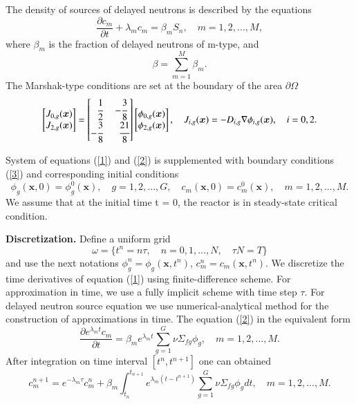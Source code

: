 \documentclass[authoryear]{elsarticle}
\begin{document}
The density of sources of delayed neutrons is described by the equations
\begin{equation}\label{2}
	\frac{\partial c_m}{\partial t} + \lambda_m c_m = \beta_m S_{n}, \quad m = 1,2, ..., M,
\end{equation}
where $\beta_m$ is the fraction of delayed neutrons of m-type, and
\[
	\beta = \sum_{m=1}^{M} \beta_m.
\] 
The Marshak-type conditions are set at the boundary of the area $\partial \Omega$
\begin{equation}\label{3}
\begin{split}
	\begin{bmatrix}
		J_{0,g}(\bm x) \\
		J_{2,g}(\bm x) \\
	\end{bmatrix}
	=
	\begin{bmatrix}
		\phantom{-} \cfrac{1}{2} & - \cfrac{3}{8} \\
	    -\cfrac{3}{8} & \phantom{-} \cfrac{21}{8} \\
	\end{bmatrix}
	\begin{bmatrix}
		\phi_{0,g}(\bm x) \\
		\phi_{2,g}(\bm x) \\
	\end{bmatrix}, \quad
	J_{i,g}(\bm x) = - D_{i,g} \nabla \phi_{i,g}(\bm x), \quad i = 0, 2.
\end{split}
\end{equation}

System of equations (\ref{1}) and (\ref{2}) is supplemented with boundary conditions (\ref{3}) and corresponding initial conditions
\begin{equation}\label{4}
	\phi_g(\bm x,0) = \phi_g^0(\bm x), \quad g = 1,2, ..., G, 
	\quad c_m(\bm x,0) = c_m^0(\bm x), \quad m = 1,2, ..., M.
\end{equation}
We assume that at the initial time t = 0, the reactor is in steady-state critical condition.

\textbf{Discretization.}
Define a uniform grid
\[
	\omega = \{ t^n=n \tau, \quad n = 0,1,...,N, \quad \tau N = T \}
\]
and use the next notations $\phi^n_g = \phi_g(\bm{x}, t^n)$, $c^n_m = c_m(\bm{x}, t^n)$. 
We discretize the time derivatives of equation (\ref{1}) using finite-difference scheme. 
For approximation in time, we use a fully implicit scheme with time step $\tau$.
For delayed neutron source equation we use numerical-analytical method for the construction of approximations in time.
The equation (\ref{2}) in the equivalent form
\[
	\frac{\partial e^{\lambda_m t} c_m}{\partial t} = 
	\beta_m e^{\lambda_m t} \sum_{g=1}^{G} \nu \Sigma_{fg} \phi_g, \quad m = 1,2, ..., M.
\]
After integration on time interval $[t^n, t^{n+1}]$ one can obtained
\begin{equation}\label{5}
	c_m^{n+1} = e^{-\lambda_m\tau} c_m^n + 
	\beta_m \int_{t_n}^{t_{n+1}} e^{\lambda_m (t - t^{n+1})} \sum_{g=1}^{G} \nu \Sigma_{fg} \phi_g d t,
	\quad m = 1,2, ..., M.
\end{equation}
\end{document}
